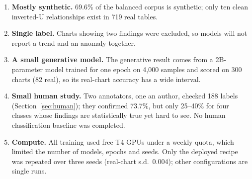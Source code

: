 \begin{enumerate}[leftmargin=1.4em]
  \item \textbf{Mostly synthetic.} 69.6\% of the balanced corpus is synthetic; only ten
  clean inverted-U relationships exist in 719 real tables.
  \item \textbf{Single label.} Charts showing two findings were excluded, so models will
  not report a trend and an anomaly together.
  \item \textbf{A small generative model.} The generative result comes from a 2B-parameter
  model trained for one epoch on 4,000 samples and scored on 300 charts (82 real), so its
  real-chart accuracy has a wide interval.
  \item \textbf{Small human study.} Two annotators, one an author, checked 188 labels
  (Section~\ref{sec:human}); they confirmed 73.7\%, but only 25--40\% for four classes whose
  findings are statistically true yet hard to see. No human classification baseline was
  completed.
  \item \textbf{Compute.} All training used free T4 GPUs under a weekly quota, which
  limited the number of models, epochs and seeds. Only the deployed recipe was repeated
  over three seeds (real-chart s.d.\ 0.004); other configurations are single runs.
\end{enumerate}
